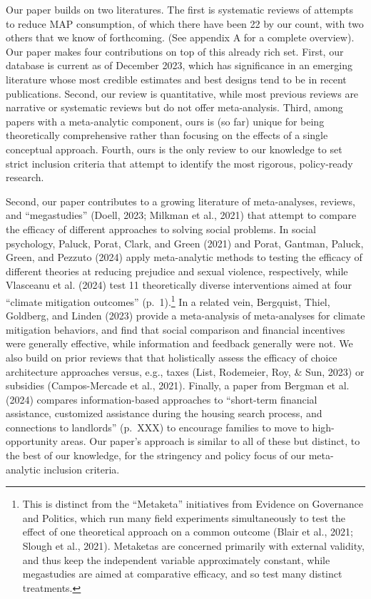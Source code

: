 \documentclass[
  man]{apa6}
\begin{document}
Our paper builds on two literatures. The first is systematic reviews of attempts to reduce MAP consumption, of which there have been 22 by our count, with two others that we know of forthcoming. (See appendix A for a complete overview). Our paper makes four contributions on top of this already rich set. First, our database is current as of December 2023, which has significance in an emerging literature whose most credible estimates and best designs tend to be in recent publications. Second, our review is quantitative, while most previous reviews are narrative or systematic reviews but do not offer meta-analysis. Third, among papers with a meta-analytic component, ours is (so far) unique for being theoretically comprehensive rather than focusing on the effects of a single conceptual approach. Fourth, ours is the only review to our knowledge to set strict inclusion criteria that attempt to identify the most rigorous, policy-ready research.

Second, our paper contributes to a growing literature of meta-analyses, reviews, and ``megastudies'' (Doell, 2023; Milkman et al., 2021) that attempt to compare the efficacy of different approaches to solving social problems. In social psychology, Paluck, Porat, Clark, and Green (2021) and Porat, Gantman, Paluck, Green, and Pezzuto (2024) apply meta-analytic methods to testing the efficacy of different theories at reducing prejudice and sexual violence, respectively, while Vlasceanu et al. (2024) test 11 theoretically diverse interventions aimed at four ``climate mitigation outcomes'' (p.~1).\footnote{This is distinct from the ``Metaketa'' initiatives from Evidence on Governance and Politics, which run many field experiments simultaneously to test the effect of one theoretical approach on a common outcome (Blair et al., 2021; Slough et al., 2021). Metaketas are concerned primarily with external validity, and thus keep the independent variable approximately constant, while megastudies are aimed at comparative efficacy, and so test many distinct treatments.} In a related vein, Bergquist, Thiel, Goldberg, and Linden (2023) provide a meta-analysis of meta-analyses for climate mitigation behaviors, and find that social comparison and financial incentives were generally effective, while information and feedback generally were not. We also build on prior reviews that that holistically assess the efficacy of choice architecture approaches versus, e.g., taxes (List, Rodemeier, Roy, \& Sun, 2023) or subsidies (Campos-Mercade et al., 2021). Finally, a paper from Bergman et al. (2024) compares information-based approaches to ``short-term financial assistance, customized assistance during the housing search process, and connections to landlords'' (p.~XXX) to encourage families to move to high-opportunity areas. Our paper's approach is similar to all of these but distinct, to the best of our knowledge, for the stringency and policy focus of our meta-analytic inclusion criteria.
\end{document}
